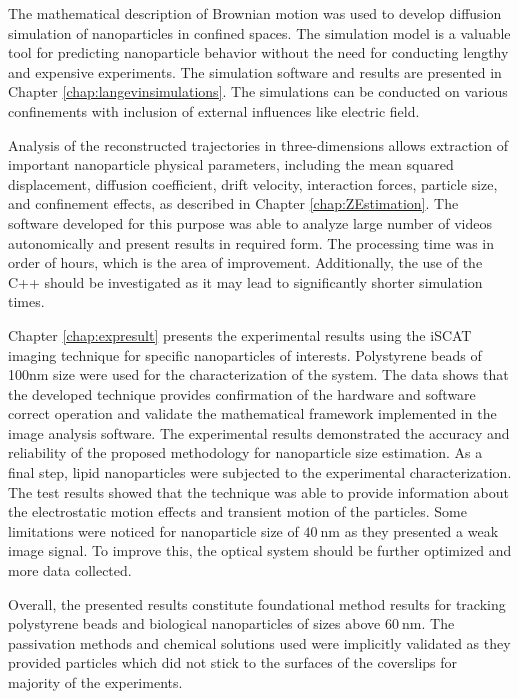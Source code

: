 The mathematical description of Brownian motion was used to develop diffusion simulation of nanoparticles in confined spaces.  The simulation model is a valuable tool for predicting nanoparticle behavior without the need for conducting lengthy and expensive experiments.  The simulation software and results are presented in Chapter \ref{chap:langevinsimulations}.  The simulations can be conducted on various confinements with inclusion of external influences like electric field.

Analysis of the reconstructed trajectories in three-dimensions allows extraction of important nanoparticle physical parameters, including the mean squared displacement, diffusion coefficient, drift velocity, interaction forces, particle size, and confinement effects, as described in Chapter \ref{chap:ZEstimation}. The software developed for this purpose was able to analyze large number of videos autonomically and present results in required form.  The processing time was in order of hours, which is the area of improvement. Additionally, the use of the C++ should be investigated as it may lead to significantly shorter simulation times.

Chapter \ref{chap:expresult} presents the experimental results using the iSCAT imaging technique for specific nanoparticles of interests.  Polystyrene beads of 100nm size were used for the characterization of the system.  The data shows that the developed technique provides confirmation of the hardware and software correct operation and validate the mathematical framework implemented in the image analysis software. The experimental results demonstrated the accuracy and reliability of the proposed methodology for nanoparticle size estimation. As a final step, lipid nanoparticles were subjected to the experimental characterization. The test results showed that the technique was able to provide information about the electrostatic motion effects and transient motion of the particles. Some limitations were noticed for nanoparticle size of $\SI{40}{\nm}$ as they presented a weak image signal. To improve this, the optical system should be further optimized and more data collected. 

Overall, the presented results constitute foundational method results for tracking polystyrene beads and biological nanoparticles of sizes above $\SI{60}{\nm}$. The passivation methods and chemical solutions used were implicitly validated as they provided particles which did not stick to the surfaces of the coverslips for majority of the experiments. %